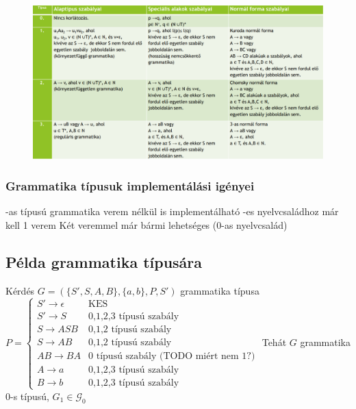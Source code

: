 \documentclass[12pt,a4paper]{article}
\begin{document}
\begin{figure}[h!]
	\centering
	\includegraphics[width=1\linewidth]{grammatika-típusok}
\end{figure}

\pagebreak

\subsubsection{Grammatika típusuk implementálási igényei}

\begin{outline}
	-as típusú grammatika verem nélkül is implementálható
	-es nyelvcsaládhoz már kell 1 verem
	\1 Két veremmel már bármi lehetséges (0-as nyelvcsalád)
\end{outline}

\subsection{Példa grammatika típusára}

\begin{outline}
	\1 Kérdés $G=(\{S',S,A,B\}, \{a,b\}, P, S')$ grammatika típusa
	\1 $P = \begin{cases}
	S' \to \epsilon & \text{KES}\\
	S' \to S & \text{0,1,2,3 típusú szabály}\\
	S \to ASB & \text{0,1,2 típusú szabály}\\
	S \to AB & \text{0,1,2 típusú szabály}\\
	AB \to BA & \text{0 típusú szabály (TODO miért nem 1?)}\\
	A \to a & \text{0,1,2,3 típusú szabály}\\
	B \to b & \text{0,1,2,3 típusú szabály}
	\end{cases}$
	\1 Tehát $G$ grammatika 0-s típusú, $G_1 \in \mathcal{G}_0$
\end{outline}
\end{document}
